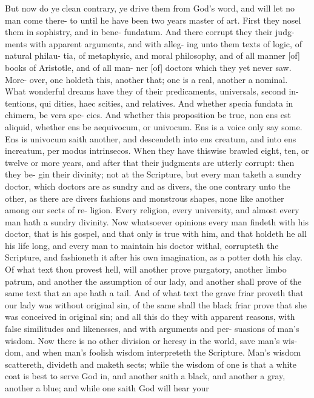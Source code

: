 \documentclass{custom}
\begin{document}
But now do ye clean contrary, ye drive them 
from God's word, and will let no man come there- 
to until he have been two years master of art. 
First they nosel them in sophistry, and in bene- 
fundatum. And there corrupt they their judg- 
ments with apparent arguments, and with alleg- 
ing unto them texts of logic, of natural philau- 
tia, of metaphysic, and moral philosophy, and of 
all manner [of] books of Aristotle, and of all man- 
ner [of] doctors which they yet never saw. More- 
over, one holdeth this, another that; one is a real, 
another a nominal. What wonderful dreams have 
they of their predicaments, universals, second in- 
tentions, qui dities, haec scities, and relatives. And 
whether specia fundata in chimera, be vera spe- 
cies. And whether this proposition be true, non 
ens est aliquid, whether ens be aequivocum, or 
univocum. Ens is a voice only say some. Ens 
is univocum saith another, and descendeth into 
ens creatum, and into ens increatum, per modus 
intrinsecos. When they have thiswise brawled 
eight, ten, or twelve or more years, and after that 
their judgments are utterly corrupt: then they be- 
gin their divinity; not at the Scripture, but every 
man taketh a sundry doctor, which doctors are as 
sundry and as divers, the one contrary unto the 
other, as there are divers fashions and monstrous 
shapes, none like another among our sects of re- 
ligion. Every religion, every university, and 
almost every man hath a sundry divinity. Now 
whatsoever opinions every man findeth with 
his doctor, that is his gospel, and that only 
is true with him, and that holdeth he all his 
life long, and every man to maintain his doctor 
withal, corrupteth the Scripture, and fashioneth 
it after his own imagination, as a potter doth his 
clay. Of what text thou provest hell, will 
another prove purgatory, another limbo patrum, 
and another the assumption of our lady, and 
another shall prove of the same text that an ape 
hath a tail. And of what text the grave friar 
proveth that our lady was without original sin, 
of the same shall the black friar prove that she 
was conceived in original sin; and all this do 
they with apparent reasons, with false similitudes 
and likenesses, and with arguments and per- 
suasions of man's wisdom. Now there is no other 
division or heresy in the world, save man's wis- 
dom, and when man's foolish wisdom interpreteth 
the Scripture. Man's wisdom scattereth, divideth 
and maketh sects; while the wisdom of one is 
that a white coat is best to serve God in, and 
another saith a black, and another a gray, another 
a blue; and while one saith God will hear your 
\end{document}
